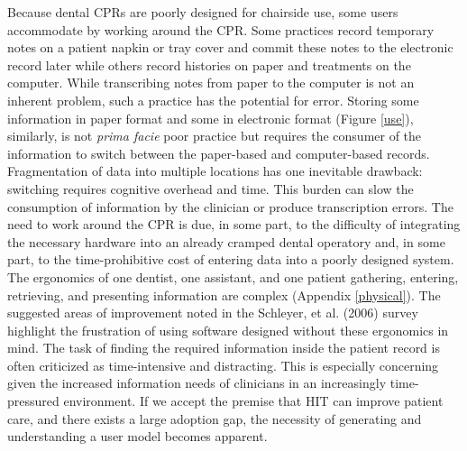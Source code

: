\documentclass[11pt]{article}
\begin{document}
Because dental CPRs are poorly designed for chairside use, some users accommodate by working around the CPR. Some practices record temporary notes on a patient napkin or tray cover and commit these notes to the electronic record later while others record histories on paper and treatments on the computer. While transcribing notes from paper to the computer is not an inherent problem, such a practice has the potential for error. Storing some information in paper format and some in electronic format (Figure \ref{use}), similarly, is not \emph{prima facie} poor practice but requires the consumer of the information to switch between the paper-based and computer-based records. Fragmentation of data into multiple locations has one inevitable drawback: switching requires cognitive overhead and time. This burden can slow the consumption of information by the clinician or produce transcription errors\cite{Salvucci2009Toward-a-unifie}. The need to work around the CPR is due, in some part, to the difficulty of integrating the necessary hardware into an already cramped dental operatory\cite{Schleyer2004Why-integration,Unthank2004Designing-your-} and, in some part, to the time-prohibitive cost of entering data into a poorly designed system. The ergonomics of one dentist, one assistant, and one patient gathering, entering, retrieving, and presenting information are complex (Appendix \ref{physical}). The suggested areas of improvement noted in the Schleyer, et al. (2006) survey highlight the frustration of using software designed without these ergonomics in mind. The task of finding the required information inside the patient record is often criticized as time-intensive and distracting\cite{Nygren1998Helping-clinici}. This is especially concerning given the increased information needs of clinicians in an increasingly time-pressured environment. If we accept the premise that HIT can improve patient care, and there exists a large adoption gap, the necessity of generating and understanding a user model becomes apparent.
\end{document}
